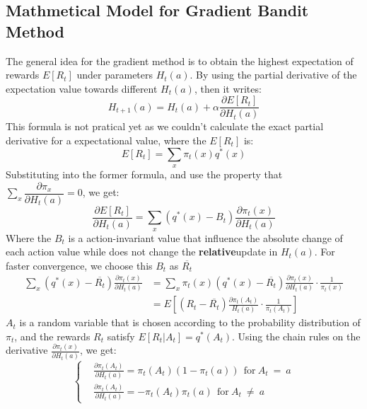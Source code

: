 \documentclass{article}
\begin{document}
\subsection{Mathmetical Model for Gradient Bandit Method}
The general idea for the gradient method is to obtain the highest expectation of rewards $E[R_t]$ under 
parameters $H_t(a)$. By using the partial derivative of the expectation value towards different $H_t(a)$, 
then it writes:
\begin{equation}
    H_{t+1}(a) = H_t(a) + \alpha \frac{\partial E[R_t]}{\partial H_t(a)}
\end{equation}
This formula is not pratical yet as we couldn't calculate the exact partial derivative for a expectational
value, where the $E[R_t]$ is:
\begin{equation}
    E[R_t] = \sum_x \pi_t(x)q^*(x)
\end{equation}
Substituting into the former formula, and use the property that $\sum_x \dfrac{\partial \pi_x}{\partial H_t(a)}=0$, 
we get:
\begin{equation}
    \frac{\partial E[R_t]}{\partial H_t(a)} = \sum_x (q^*(x) - B_t)\frac{\partial \pi_t(x)}{\partial H_t(a)}
\end{equation}
Where the $B_t$ is a action-invariant value that influence the absolute change of each action value while
does not change the \textbf{relative}update in $H_t(a)$. For faster convergence, we choose this $B_t$ as 
$\overline{R_t}$
\begin{equation}
    \begin{aligned}
    \sum_x (q^*(x) - \overline{R_t})\frac{\partial \pi_t(x)}{\partial H_t(a)} &=  \sum_x \pi_t(x)(q^*(x) 
    - \overline{R_t})\frac{\partial \pi_t(x)}{\partial H_t(a)}\cdot \frac{1}{\pi_t(x)} \\
    &=E[(R_t - \overline{R_t})\frac{\partial \pi_t(A_t)}{H_t(a)}\cdot\frac{1}{\pi_t(A_t)}]
    \end{aligned}
\end{equation}
$A_t$ is a random variable that is chosen according to the probability distribution of $\pi_t$, and the 
rewards $R_t$ satisfy $E[R_t|A_t] = q^*(A_t)$. Using the chain rules on the derivative $\frac{\partial \pi_t(x)}
{\partial H_t(a)}$, we get:
\begin{equation}
    \left\{\begin{aligned}
    &\frac{\partial \pi_t(A_t)}{\partial H_t(a)} = \pi_t(A_t)(1-\pi_t(a))~~\text{for}~ A_t~=~ a\\
    &\frac{\partial \pi_t(A_t)}{\partial H_t(a)} = -\pi_t(A_t)\pi_t(a) ~~\text{for}~ A_t ~\neq~ a
    \end{aligned}\right.
\end{equation}
\end{document}
